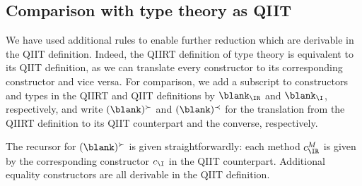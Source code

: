 \documentclass[a4paper,UKenglish,numberwithinsect,cleveref,thm-restate]{lipics-v2021}
\begin{document}
%

\subsection{Comparison with type theory as QIIT} \label{subsec:equivalence}
We have used additional rules to enable further reduction which are derivable in the QIIT definition.
Indeed, the QIIRT definition of type theory is equivalent to its QIIT definition, as we can translate every constructor to its corresponding constructor and vice versa.
For comparison, we add a subscript to constructors and types in the QIIRT and QIIT definitions by $\blank_\IR$ and $\blank_\I$, respectively, and write $(\blank)^{\succ}$ and $(\blank)^{\prec}$ for the translation from the QIIRT definition to its QIIT counterpart and the converse, respectively.

The recursor for $(\blank)^{\succ}$ is given straightforwardly: each method $c^M_{\IR}$ is given by the corresponding constructor $c_{\I}$ in the QIIT counterpart.
Additional equality constructors are all derivable in the QIIT definition. 
\end{document}

